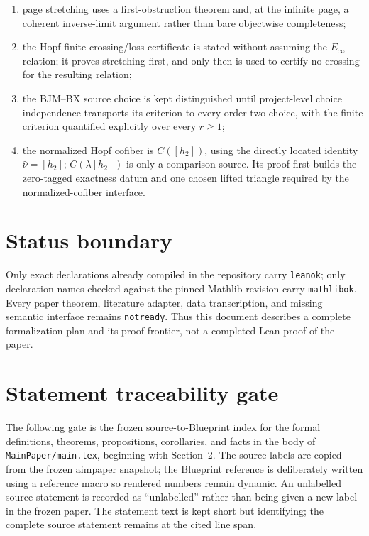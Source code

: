\begin{enumerate}
  \item page stretching uses a first-obstruction theorem and, at the infinite
    page, a coherent inverse-limit argument rather than bare objectwise
    completeness;
  \item the Hopf finite crossing/loss certificate is stated without assuming
    the $E_\infty$ relation; it proves stretching first, and only then is used
    to certify no crossing for the resulting relation;
  \item the BJM--BX source choice is kept distinguished until project-level
    choice independence transports its criterion to every order-two choice,
    with the finite criterion quantified explicitly over every $r\ge1$;
  \item the normalized Hopf cofiber is $C([h_2])$, using the directly located
    identity $\widehat\nu=[h_2]$; $C(\lambda[h_2])$ is only a comparison
    source.  Its proof first builds the zero-tagged exactness datum and one
    chosen lifted triangle required by the normalized-cofiber interface.
\end{enumerate}

\section{Status boundary}

Only exact declarations already compiled in the repository carry
\texttt{leanok}; only declaration names checked against the pinned Mathlib
revision carry \texttt{mathlibok}.  Every paper theorem, literature adapter,
data transcription, and missing semantic interface remains
\texttt{notready}.  Thus this document describes a complete formalization
plan and its proof frontier, not a completed Lean proof of the paper.

\section{Statement traceability gate}

The following gate is the frozen source-to-Blueprint index for the formal
definitions, theorems, propositions, corollaries, and facts in the body of
\texttt{MainPaper/main.tex}, beginning with Section~2. The source labels are
copied from the frozen
aimpaper snapshot; the Blueprint reference is deliberately
written using a reference macro so rendered numbers remain dynamic. An unlabelled
source statement is recorded as ``unlabelled'' rather than being given a new
label in the frozen paper. The statement text is kept short but identifying;
the complete source statement remains at the cited line span.

